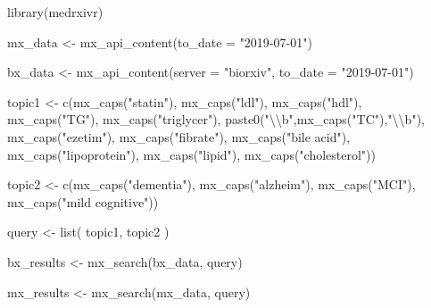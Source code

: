 \documentclass[a4paper, twoside]{templates/ociamthesis}
\newenvironment{Shaded}{\begin{snugshade}}{\end{snugshade}}
\newcommand{\AttributeTok}[1]{\textcolor[rgb]{0.77,0.63,0.00}{#1}}
\newcommand{\FunctionTok}[1]{\textcolor[rgb]{0.00,0.00,0.00}{#1}}
\newcommand{\NormalTok}[1]{#1}
\newcommand{\OtherTok}[1]{\textcolor[rgb]{0.56,0.35,0.01}{#1}}
\newcommand{\SpecialCharTok}[1]{\textcolor[rgb]{0.00,0.00,0.00}{#1}}
\newcommand{\StringTok}[1]{\textcolor[rgb]{0.31,0.60,0.02}{#1}}
\renewenvironment{Shaded}
{
  \vspace{4pt}%
  \begin{snugshade}%
}{%
  \end{snugshade}%
  \vspace{4pt}%
}
\begin{document}
\begin{Shaded}
\begin{Highlighting}[]
\FunctionTok{library}\NormalTok{(medrxivr)}

\NormalTok{mx\_data }\OtherTok{\textless{}{-}} \FunctionTok{mx\_api\_content}\NormalTok{(}\AttributeTok{to\_date =} \StringTok{"2019{-}07{-}01"}\NormalTok{)}

\NormalTok{bx\_data }\OtherTok{\textless{}{-}} \FunctionTok{mx\_api\_content}\NormalTok{(}\AttributeTok{server =} \StringTok{"biorxiv"}\NormalTok{,}
                                    \AttributeTok{to\_date =} \StringTok{"2019{-}07{-}01"}\NormalTok{)}

\NormalTok{topic1 }\OtherTok{\textless{}{-}} \FunctionTok{c}\NormalTok{(}\FunctionTok{mx\_caps}\NormalTok{(}\StringTok{"statin"}\NormalTok{),}
            \FunctionTok{mx\_caps}\NormalTok{(}\StringTok{"ldl"}\NormalTok{),}
            \FunctionTok{mx\_caps}\NormalTok{(}\StringTok{"hdl"}\NormalTok{),}
            \FunctionTok{mx\_caps}\NormalTok{(}\StringTok{"TG"}\NormalTok{),}
            \FunctionTok{mx\_caps}\NormalTok{(}\StringTok{"triglycer"}\NormalTok{),}
            \FunctionTok{paste0}\NormalTok{(}\StringTok{"}\SpecialCharTok{\textbackslash{}\textbackslash{}}\StringTok{b"}\NormalTok{,}\FunctionTok{mx\_caps}\NormalTok{(}\StringTok{"TC"}\NormalTok{),}\StringTok{"}\SpecialCharTok{\textbackslash{}\textbackslash{}}\StringTok{b"}\NormalTok{),}
            \FunctionTok{mx\_caps}\NormalTok{(}\StringTok{"ezetim"}\NormalTok{),}
            \FunctionTok{mx\_caps}\NormalTok{(}\StringTok{"fibrate"}\NormalTok{),}
            \FunctionTok{mx\_caps}\NormalTok{(}\StringTok{"bile acid"}\NormalTok{),}
            \FunctionTok{mx\_caps}\NormalTok{(}\StringTok{"lipoprotein"}\NormalTok{),}
            \FunctionTok{mx\_caps}\NormalTok{(}\StringTok{"lipid"}\NormalTok{),}
            \FunctionTok{mx\_caps}\NormalTok{(}\StringTok{"cholesterol"}\NormalTok{))}

\NormalTok{topic2 }\OtherTok{\textless{}{-}} \FunctionTok{c}\NormalTok{(}\FunctionTok{mx\_caps}\NormalTok{(}\StringTok{"dementia"}\NormalTok{),}
            \FunctionTok{mx\_caps}\NormalTok{(}\StringTok{"alzheim"}\NormalTok{),}
            \FunctionTok{mx\_caps}\NormalTok{(}\StringTok{"MCI"}\NormalTok{),}
            \FunctionTok{mx\_caps}\NormalTok{(}\StringTok{"mild cognitive"}\NormalTok{))}

\NormalTok{query }\OtherTok{\textless{}{-}} \FunctionTok{list}\NormalTok{(}
\NormalTok{  topic1,}
\NormalTok{  topic2}
\NormalTok{)}

\NormalTok{bx\_results }\OtherTok{\textless{}{-}} \FunctionTok{mx\_search}\NormalTok{(bx\_data, query)}


\NormalTok{mx\_results }\OtherTok{\textless{}{-}} \FunctionTok{mx\_search}\NormalTok{(mx\_data, query)}
\end{Highlighting}
\end{Shaded}
\end{document}
